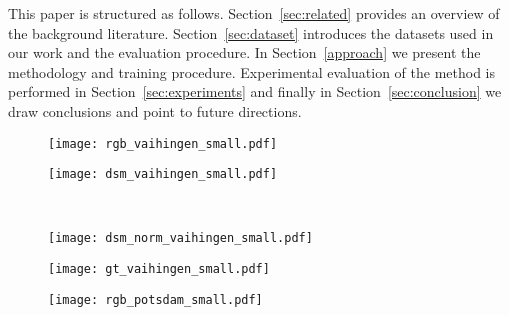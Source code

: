 \documentclass[journal]{IEEEtran}
\begin{document}
This paper is structured as follows. Section~\ref{sec:related} provides an overview of the background literature. Section~\ref{sec:dataset} introduces the datasets used in our work and the evaluation procedure. In Section~\ref{approach} we present the methodology and training procedure. Experimental evaluation of the method is performed in Section~\ref{sec:experiments} and finally in Section~\ref{sec:conclusion} we draw conclusions and point to future directions.

\begin{figure*}[ht]
\begin{minipage}[t]{0.49\textwidth}
    \centering
    \begin{subfigure}[b]{0.48\textwidth}
        \centering
        \texttt{[image: rgb\_vaihingen\_small.pdf]}
    \end{subfigure}
    \begin{subfigure}[b]{0.48\textwidth}
        \centering
        \texttt{[image: dsm\_vaihingen\_small.pdf]}
    \end{subfigure}\\
    \begin{subfigure}[b]{0.48\textwidth}
        \centering
        \texttt{[image: dsm\_norm\_vaihingen\_small.pdf]}
    \end{subfigure}
    \begin{subfigure}[b]{0.48\textwidth}
        \centering
        \texttt{[image: gt\_vaihingen\_small.pdf]}
    \end{subfigure}
    \caption{A small example patch from the Vaihingen validation dataset. From left to right and top to bottom: RG+I image, DSM, normalized DSM, and ground truth image. It illustrates the difference in size between classes, such as the car class (yellow) and the building class (blue).}
    \label{fig:exampleData}
\end{minipage}\hspace{0.2cm}
\begin{minipage}[t]{0.49\textwidth}
    \centering
    \begin{subfigure}[b]{0.48\textwidth}
        \centering
        \texttt{[image: rgb\_potsdam\_small.pdf]}

\end{subfigure}
\end{minipage}
\end{figure*}
\end{document}
